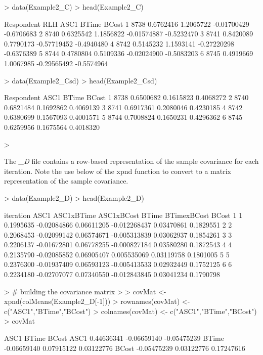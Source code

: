 \documentclass{article}
\begin{document}
\begin{Schunk}
\begin{Sinput}
> data(Example2_C)
> head(Example2_C)
\end{Sinput}
\begin{Soutput}
  Respondent       RLH      ASC1       BTime      BCost
1       8738 0.6762416 1.2065722 -0.01700429 -0.6706683
2       8740 0.6325542 1.1856822 -0.01574887 -0.5232470
3       8741 0.8420089 0.7790173 -0.57719452 -0.4940480
4       8742 0.5145232 1.1593141 -0.27220298 -0.6376389
5       8744 0.4780804 0.5109336 -0.02024900 -0.5083203
6       8745 0.4919669 1.0067985 -0.29565492 -0.5574964
\end{Soutput}
\begin{Sinput}
> data(Example2_Csd)
> head(Example2_Csd)
\end{Sinput}
\begin{Soutput}
  Respondent      ASC1     BTime     BCost
1       8738 0.6500682 0.1615823 0.4068272
2       8740 0.6821484 0.1692862 0.4069139
3       8741 0.6917361 0.2080046 0.4230185
4       8742 0.6380699 0.1567093 0.4001571
5       8744 0.7008824 0.1650231 0.4296362
6       8745 0.6259956 0.1675564 0.4018320
\end{Soutput}
\begin{Sinput}
> 
\end{Sinput}
\end{Schunk}


The \emph{\_D} file contains a row-based representation of the sample covariance for each iteration. Note the use below of the xpnd function to convert to a matrix representation of the sample covariance.

\begin{Schunk}
\begin{Sinput}
> data(Example2_D)
> head(Example2_D)
\end{Sinput}
\begin{Soutput}
  iteration      ASC1  ASC1xBTime ASC1xBCost        BTime BTimexBCost     BCost
1         1 0.1995635 -0.02084866 0.06611205 -0.012268437  0.03470861 0.1829551
2         2 0.2068453 -0.02099142 0.06574671 -0.005313839  0.03062937 0.1854261
3         3 0.2206137 -0.01672801 0.06778255 -0.000827184  0.03580280 0.1872543
4         4 0.2135790 -0.02085852 0.06905407  0.005535069  0.03119758 0.1801005
5         5 0.2376300 -0.01937409 0.06593123 -0.005413533  0.02932449 0.1752125
6         6 0.2234180 -0.02707077 0.07340550 -0.012843845  0.03041234 0.1790798
\end{Soutput}
\begin{Sinput}
> # building the covariance matrix
> 
> covMat <- xpnd(colMeans(Example2_D[-1]))
> rownames(covMat) <- c("ASC1","BTime","BCost")
> colnames(covMat) <- c("ASC1","BTime","BCost")
> covMat
\end{Sinput}
\begin{Soutput}
             ASC1       BTime       BCost
ASC1   0.44636341 -0.06659140 -0.05475239
BTime -0.06659140  0.07915122  0.03122776
BCost -0.05475239  0.03122776  0.17247616
\end{Soutput}
\end{Schunk}
\end{document}
